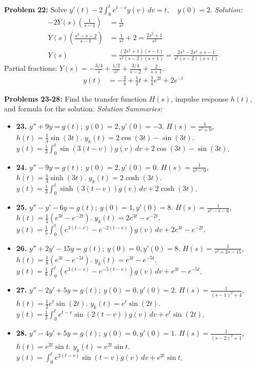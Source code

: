 \documentclass[11pt, letterpaper]{article}
\theoremstyle{definition}
\theoremstyle{remark}
\begin{document}
\textbf{Problem 22:} Solve $y'(t) - 2\int_0^t e^{t-v}y(v) \, dv = t, \quad y(0)=2$.
\textit{Solution:}
\begin{align*}
[sY(s) - 2] - 2Y(s)\left(\frac{1}{s-1}\right) &= \frac{1}{s^2} \\[4pt]
Y(s)\left(\frac{s^2-s-2}{s-1}\right) &= \frac{1}{s^2} + 2 = \frac{2s^2+1}{s^2} \\[4pt]
Y(s) &= \frac{(2s^2+1)(s-1)}{s^2(s-2)(s+1)} = \frac{2s^3-2s^2+s-1}{s^2(s-2)(s+1)}
\end{align*}
Partial fractions: $Y(s) = -\frac{3/4}{s} + \frac{1/2}{s^2} + \frac{3/4}{s-2} + \frac{2}{s+1}$.
\begin{align*}
y(t) &= -\frac{3}{4} + \frac{1}{2}t + \frac{3}{4}e^{2t} + 2e^{-t}
\end{align*}

\textbf{Problems 23-28:} Find the transfer function $H(s)$, impulse response $h(t)$, and formula for the solution.
\textit{Solution Summaries:}
\begin{itemize}
    \item \textbf{23.} $y'' + 9y = g(t); \ y(0)=2, y'(0)=-3$.
    $H(s) = \frac{1}{s^2+9}$, $h(t) = \frac{1}{3}\sin(3t)$. $y_k(t) = 2\cos(3t) - \sin(3t)$.
    $y(t) = \frac{1}{3}\int_0^t \sin(3(t-v))g(v) \, dv + 2\cos(3t) - \sin(3t)$.
    
    \item \textbf{24.} $y'' - 9y = g(t); \ y(0)=2, y'(0)=0$.
    $H(s) = \frac{1}{s^2-9}$, $h(t) = \frac{1}{3}\sinh(3t)$. $y_k(t) = 2\cosh(3t)$.
    $y(t) = \frac{1}{3}\int_0^t \sinh(3(t-v))g(v) \, dv + 2\cosh(3t)$.
    
    \item \textbf{25.} $y'' - y' - 6y = g(t); \ y(0)=1, y'(0)=8$.
    $H(s) = \frac{1}{s^2-s-6}$, $h(t) = \frac{1}{5}(e^{3t} - e^{-2t})$. $y_k(t) = 2e^{3t} - e^{-2t}$.
    $y(t) = \frac{1}{5}\int_0^t (e^{3(t-v)} - e^{-2(t-v)})g(v) \, dv + 2e^{3t} - e^{-2t}$.
    
    \item \textbf{26.} $y'' + 2y' - 15y = g(t); \ y(0)=0, y'(0)=8$.
    $H(s) = \frac{1}{s^2+2s-15}$, $h(t) = \frac{1}{8}(e^{3t} - e^{-5t})$. $y_k(t) = e^{3t} - e^{-5t}$.
    $y(t) = \frac{1}{8}\int_0^t (e^{3(t-v)} - e^{-5(t-v)})g(v) \, dv + e^{3t} - e^{-5t}$.
    
    \item \textbf{27.} $y'' - 2y' + 5y = g(t); \ y(0)=0, y'(0)=2$.
    $H(s) = \frac{1}{(s-1)^2+4}$, $h(t) = \frac{1}{2}e^t\sin(2t)$. $y_k(t) = e^t\sin(2t)$.
    $y(t) = \frac{1}{2}\int_0^t e^{t-v}\sin(2(t-v))g(v) \, dv + e^t\sin(2t)$.
    
    \item \textbf{28.} $y'' - 4y' + 5y = g(t); \ y(0)=0, y'(0)=1$.
    $H(s) = \frac{1}{(s-2)^2+1}$, $h(t) = e^{2t}\sin t$. $y_k(t) = e^{2t}\sin t$.
    $y(t) = \int_0^t e^{2(t-v)}\sin(t-v)g(v) \, dv + e^{2t}\sin t$.
\end{itemize}
\end{document}
